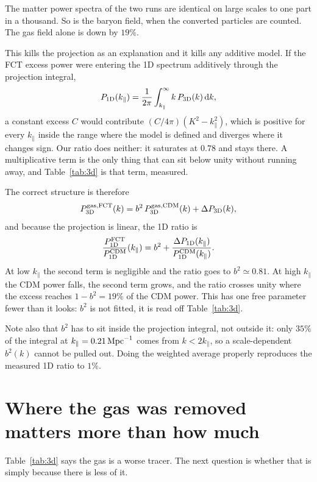 \documentclass[11pt,a4paper]{article}
\newcommand{\Pod}{\ensuremath{P_{\rm 1D}}}
\begin{document}
The matter power spectra of the two runs are identical on large scales to
one part in a thousand. So is the baryon field, when the converted
particles are counted. The gas field alone is down by $19\%$.

This kills the projection as an explanation and it kills any additive
model. If the FCT excess power were entering the 1D spectrum additively
through the projection integral,
\begin{equation}
\Pod(k_\parallel) = \frac{1}{2\pi}\int_{k_\parallel}^{\infty} k\,P_{\rm 3D}(k)\,{\rm d}k ,
\end{equation}
a constant excess $C$ would contribute $(C/4\pi)(K^2 - k_\parallel^2)$,
which is positive for every $k_\parallel$ inside the range where the model
is defined and diverges where it changes sign. Our ratio does neither: it
saturates at $0.78$ and stays there. A multiplicative term is the only
thing that can sit below unity without running away, and Table~\ref{tab:3d}
is that term, measured.

The correct structure is therefore
\begin{equation}
P^{\rm gas,FCT}_{\rm 3D}(k) = b^2\,P^{\rm gas,CDM}_{\rm 3D}(k) + \Delta P_{\rm 3D}(k) ,
\end{equation}
and because the projection is linear, the 1D ratio is
\begin{equation}
\frac{\Pod^{\rm FCT}}{\Pod^{\rm CDM}}(k_\parallel)
= b^2 + \frac{\Delta \Pod(k_\parallel)}{\Pod^{\rm CDM}(k_\parallel)} .
\end{equation}
At low $k_\parallel$ the second term is negligible and the ratio goes to
$b^2 \simeq 0.81$. At high $k_\parallel$ the CDM power falls, the second
term grows, and the ratio crosses unity where the excess reaches
$1 - b^2 = 19\%$ of the CDM power. This has one free parameter fewer than
it looks: $b^2$ is not fitted, it is read off Table~\ref{tab:3d}.

Note also that $b^2$ has to sit inside the projection integral, not outside
it: only $35\%$ of the integral at $k_\parallel = 0.21\,{\rm Mpc}^{-1}$
comes from $k < 2k_\parallel$, so a scale-dependent $b^2(k)$ cannot be
pulled out. Doing the weighted average properly reproduces the measured 1D
ratio to $1\%$.

\section{Where the gas was removed matters more than how much}

Table~\ref{tab:3d} says the gas is a worse tracer. The next question is
whether that is simply because there is less of it.
\end{document}
